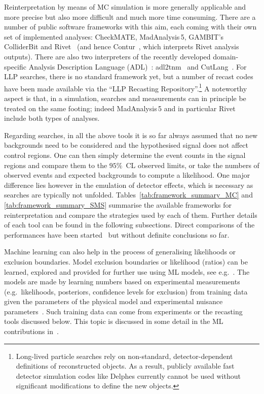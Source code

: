 \documentclass[a4paper,aps,prd,longbibliography,notitlepage,showpacs,amsmath,amssymb,superscriptaddress,nofootinbib,floatfix,11pt,preprintnumbers]{revtex4-1-mod}
\newcommand{\gambit}{\textsf{GAMBIT}\xspace}
\newcommand{\rivet}{\textsf{Rivet}\xspace}
\newcommand{\contur}{\textsf{Contur}\xspace}
\newcommand{\checkmate}{\textsf{CheckMATE}\xspace}
\newcommand{\colliderbit}{\textsf{ColliderBit}\xspace}
\newcommand{\madanalysis}{\textsf{MadAnalysis\,5}\xspace}
\newcommand{\adltnm}{\textsf{adl2tnm}\xspace}
\newcommand{\cutlang}{\textsf{CutLang}\xspace}
\newcommand{\delphes}{\textsf{Delphes}\xspace}
\newcommand{\eg}{e.g.\xspace}
\begin{document}
Reinterpretation by means of MC simulation is more generally applicable and more precise but also more difficult and much more time consuming. There are a number of public software frameworks with this aim, each coming with their own set of implemented analyses: \checkmate \cite{Drees:2013wra,Dercks:2016npn}, \madanalysis \cite{Conte:2012fm,Conte:2014zja,Dumont:2014tja,Conte:2018vmg}, \gambit's \colliderbit \cite{gambit,grev,ColliderBit,GAMBIT:EWMSSM} and \rivet~\cite{Buckley:2010ar,Bierlich:2019rhm} (and hence \contur~\cite{Butterworth:2016sqg}, which interprets \rivet analysis outputs).  There are also two interpreters of the recently developed domain-specific Analysis Description Language  (ADL)~\cite{Brooijmans:2016vro, Brooijmans:2020yij}: \adltnm~\cite{Brooijmans:2018xbu}
and \cutlang~\cite{Sekmen:2018ehb, Unel:2019reo}.
For LLP searches, there is no standard framework yet, but a number of recast codes have been made available via the ``LLP Recasting Repository''.\footnote{Long-lived particle searches rely on non-standard,  detector-dependent definitions of reconstructed objects.  As a result, publicly available fast detector simulation codes like \delphes currently cannot be used without significant modifications to define the new objects.}
A noteworthy aspect is that, in a simulation, searches and measurements can in principle be treated on the same footing; indeed \madanalysis and in particular \rivet include both types of analyses.

Regarding searches, in all the above tools it is so far
always assumed that no new backgrounds
need to be considered and the hypothesised signal does not affect control regions. One can then simply determine the
event counts in the signal regions and compare them to the $95\%$~CL observed limits, or take the numbers of observed events and expected backgrounds to compute a likelihood.
One major difference lies however in the emulation of detector effects, which is necessary as searches are typically not unfolded.
%
Tables~\ref{tab:framework_summary_MC} and \ref{tab:framework_summary_SMS} summarise the available frameworks for reinterpretation and compare the strategies used by each of them.
Further details of each tool can be found in the following subsections.
Direct comparisons of the performances have been started~\cite{Brooijmans:2018xbu,Brooijmans:2020yij} but without definite conclusions so far.

Machine learning can also help in the process of generalising likelihoods or exclusion boundaries. Model exclusion boundaries or likelihood (ratios) can be learned, explored and provided for further use using ML models, see \eg~\cite{Brehmer:2018kdj, Caron:2016hib}. The models are made by learning numbers based on experimental measurements (e.g.\ likelihoods, posteriors, confidence levels for exclusion) from training data given the parameters of the physical model and experimental nuisance parameters~\cite{Coccaro:2019lgs}. Such training data can come from experiments or the recasting tools discussed below. This topic is discussed in some detail in the ML contributions in~\cite{Brooijmans:2020yij}.
\end{document}
